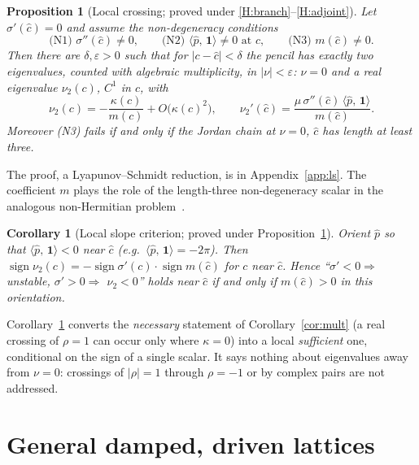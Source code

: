 \documentclass[11pt]{article}
\theoremstyle{plain}
\newtheorem{proposition}[theorem]{Proposition}
\newtheorem{corollary}[theorem]{Corollary}
\theoremstyle{definition}
\theoremstyle{remark}
\newcommand{\ip}[2]{\langle #1,\,#2\rangle}
\newcommand{\ph}{\hat p}
\newcommand{\one}{\mathbf 1}
\newcommand{\tagC}[1]{\textsf{proved under #1}}
\begin{document}
\begin{proposition}[Local crossing; \tagC{\ref{H:branch}--\ref{H:adjoint}}]\label{prop:crossing}
Let $\sigma'(\hat c)=0$ and assume the non-degeneracy conditions
\[
  \text{(N1) } \sigma''(\hat c)\neq0,\qquad
  \text{(N2) } \ip{\ph}{\one}\neq0 \text{ at }\hat c,\qquad
  \text{(N3) } m(\hat c)\neq0 .
\]
Then there are $\delta,\varepsilon>0$ such that for $|c-\hat c|<\delta$ the pencil has exactly
two eigenvalues, counted with algebraic multiplicity, in $|\nu|<\varepsilon$: $\nu=0$ and a real
eigenvalue $\nu_2(c)$, $C^1$ in $c$, with
\begin{equation}\label{eq:nu2}
  \nu_2(c)=-\frac{\kappa(c)}{m(c)}+O\bigl(\kappa(c)^2\bigr),\qquad
  \nu_2'(\hat c)=\frac{\mu\,\sigma''(\hat c)\,\ip{\ph}{\one}}{m(\hat c)} .
\end{equation}
Moreover (N3) fails if and only if the Jordan chain at $\nu=0$, $\hat c$ has length at least
three.
\end{proposition}

The proof, a Lyapunov--Schmidt reduction, is in Appendix~\ref{app:ls}. The coefficient $m$
plays the role of the length-three non-degeneracy scalar in the analogous non-Hermitian
problem~\cite{VK-NH}.

\begin{corollary}[Local slope criterion; \tagC{Proposition~\ref{prop:crossing}}]\label{cor:local}
Orient $\ph$ so that $\ip{\ph}{\one}<0$ near $\hat c$ (e.g.\ $\ip{\ph}{\one}=-2\pi$). Then
$\operatorname{sign}\nu_2(c)=-\operatorname{sign}\sigma'(c)\cdot\operatorname{sign}m(\hat c)$
for $c$ near $\hat c$. Hence ``$\sigma'<0\Rightarrow$ unstable, $\sigma'>0\Rightarrow$
$\nu_2<0$'' holds near $\hat c$ if and only if $m(\hat c)>0$ in this orientation.
\end{corollary}

Corollary~\ref{cor:local} converts the \emph{necessary} statement of
Corollary~\ref{cor:mult} (a real crossing of $\rho=1$ can occur only where $\kappa=0$) into a
local \emph{sufficient} one, conditional on the sign of a single scalar. It says nothing
about eigenvalues away from $\nu=0$: crossings of $|\rho|=1$ through $\rho=-1$ or by complex
pairs are not addressed.

\section{General damped, driven lattices}\label{sec:general}
\end{document}
